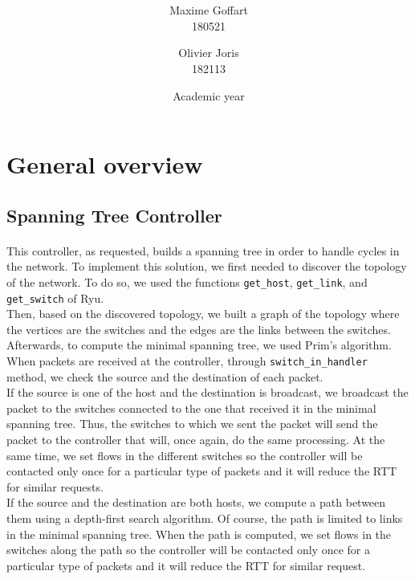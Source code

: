 \documentclass[a4paper, 11pt, oneside]{article}
\title{\ClassName\\\vspace*{0.8cm}\ProjectName\vspace{1cm}}
\author{Maxime Goffart \\180521 \and Olivier Joris\\182113}
\date{\vspace{1cm}Academic year \AcademicYear}
\begin{document}
\begin{titlingpage}
{\let\newpage\relax\maketitle}
\end{titlingpage}

\thispagestyle{empty}
\newpage


\section{General overview}

\subsection{Spanning Tree Controller}
\paragraph{}This controller, as requested, builds a spanning tree in order to handle cycles in the network. To implement this solution, we first needed to discover the topology of the network. To do so, we used the functions \texttt{get\_host}, \texttt{get\_link}, and \texttt{get\_switch} of Ryu.\\
Then, based on the discovered topology, we built a graph of the topology where the vertices are the switches and the edges are the links between the switches. Afterwards, to compute the minimal spanning tree, we used Prim's algorithm.\\
\indent When packets are received at the controller, through \texttt{switch\_in\_handler} method, we check the source and the destination of each packet.\\
If the source is one of the host and the destination is broadcast, we broadcast the packet to the switches connected to the one that received it in the minimal spanning tree. Thus, the switches to which we sent the packet will send the packet to the controller that will, once again, do the same processing. At the same time, we set flows in the different switches so the controller will be contacted only once for a particular type of packets and it will reduce the RTT for similar requests.\\
If the source and the destination are both hosts, we compute a path between them using a depth-first search algorithm. Of course, the path is limited to links in the minimal spanning tree. When the path is computed, we set flows in the switches along the path so the controller will be contacted only once for a particular type of packets and it will reduce the RTT for similar request.
\end{document}
